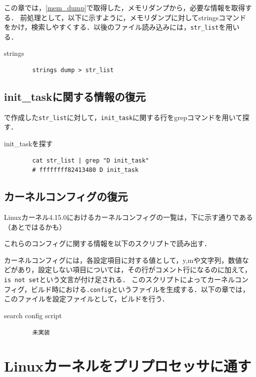 この章では，\ref{mem_dump}で取得した，メモリダンプから，必要な情報を取得する．
前処理として，以下に示すように，メモリダンプに対してstringsコマンドをかけ，検索しやすくする．以後のファイル読み込みには，\verb|str_list|を用いる．

\begin{itembox}[l]{strings}
    \begin{verbatim}
        strings dump > str_list
    \end{verbatim}
\end{itembox}

\subsection{init\_taskに関する情報の復元}

\label{section:mem_dump}で作成した\verb|str_list|に対して，\verb|init_task|に関する行をgrepコマンドを用いて探す．

\begin{itembox}[l]{init_taskを探す}
    \begin{verbatim}
        cat str_list | grep "D init_task"
        # ffffffff82413480 D init_task
    \end{verbatim}
\end{itembox}

\subsection{カーネルコンフィグの復元}

Linuxカーネル4.15.0におけるカーネルコンフィグの一覧は，下に示す通りである（あとではるかも）

これらのコンフィグに関する情報を以下のスクリプトで読み出す．

カーネルコンフィグには，各設定項目に対する値として，y,mや文字列，数値などがあり，設定しない項目については，その行がコメント行になるのに加えて，\verb|is not set|という文言が付け足される．
このスクリプトによってカーネルコンフィグ，ビルド時における\verb|.config|というファイルを生成する．以下の章では，このファイルを設定ファイルとして，ビルドを行う．

\begin{itembox}[l]{search config script}
    \begin{verbatim}
        未実装
    \end{verbatim}
\end{itembox}

\section{Linuxカーネルをプリプロセッサに通す}

